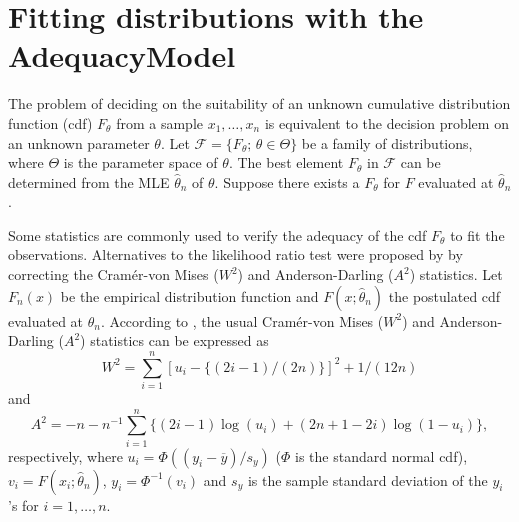 \documentclass[10pt,letterpaper]{article}
\begin{document}
\section{Fitting distributions with the AdequacyModel}

The problem of deciding on the suitability of an unknown cumulative distribution function (cdf) $F_\theta$
from a sample $x_1,\ldots,x_n$ is equivalent to the decision problem on an unknown parameter $\theta$.
Let $\mathcal{F} = \{F_\theta;\,\theta \in \Theta \}$ be a family of distributions, where $\Theta$ is the parameter space of $\theta$.
The best element $F_{\theta}$ in $\mathcal{F}$ can be determined from the MLE $\widehat{\theta}_n$ of $\theta$.
Suppose there exists a $F_{\theta}$ for $F$ evaluated at $\widehat{\theta}_n$.

Some statistics are commonly used to verify the adequacy of the cdf $F_\theta$ to fit the observations.
Alternatives to the likelihood ratio test were proposed by \cite{chen1995general} by correcting the Cram\'er-von Mises ($W^2$) and Anderson-Darling ($A^2$) statistics.
Let $F_n(x)$ be the empirical distribution function and $F(x;\widehat \theta_n)$ the postulated cdf evaluated at $\widehat \theta_n$.
According to \cite{chen1995general}, the usual Cram\'er-von Mises ($W^2$) and Anderson-Darling ($A^2$) statistics can be expressed as
\begin{equation}
\label{eq:w2}
W^2 = \sum_{i=1}^{n}[u_i - \{(2i-1)/(2n) \}]^2 + 1/(12n)
\end{equation}
and
\begin{equation}
\label{eq:a2}
A^2 = -n - n^{-1}\sum_{i=1}^{n}\{(2i-1)\log(u_i) + (2n+1-2i)\log(1-u_i)\},
\end{equation}
respectively, where $u_i = \Phi((y_i-\overline{y})/s_y)$ ($\Phi$ is the standard normal cdf),
$v_i = F(x_i; \widehat \theta_n)$, $y_i = \Phi^{-1}(v_i)$ and $s_y$ is the sample standard deviation of the $y_i$'s for $i=1,\ldots, n$.
\end{document}
